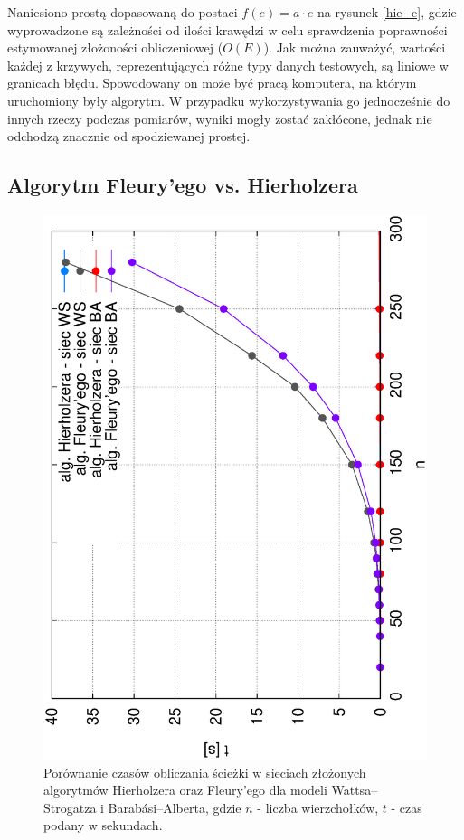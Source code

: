 \documentclass[a4paper, 12pt, twoside, openright]{article}
\begin{document}
	Naniesiono prostą dopasowaną do postaci $f(e) = a \cdot e$ na rysunek \ref{hie_e}, gdzie wyprowadzone są zależności od ilości krawędzi w celu sprawdzenia poprawności estymowanej złożoności obliczeniowej ($O(E)$). Jak można zauważyć, wartości każdej z krzywych, reprezentujących różne typy danych testowych, są liniowe w granicach błędu. Spowodowany on może być pracą komputera, na którym uruchomiony były algorytm. W przypadku wykorzystywania go jednocześnie do innych rzeczy podczas pomiarów, wyniki mogły zostać zakłócone, jednak nie odchodzą znacznie od spodziewanej prostej.


\subsection{Algorytm Fleury'ego vs. Hierholzera}

	\begin{figure}[h]
	\centering
	\includegraphics[angle=270,width=1\textwidth]{img/wyniki/Hierholzer_vs_Fleury_WS_BA_n}
	\caption[]{Porównanie czasów obliczania ścieżki w sieciach złożonych algorytmów Hierholzera oraz Fleury'ego dla modeli Wattsa–Strogatza i Barabási–Alberta, gdzie $n$ - liczba wierzchołków, $t$ - czas podany w sekundach.}
	\label{fh}
	\end{figure}
\end{document}
